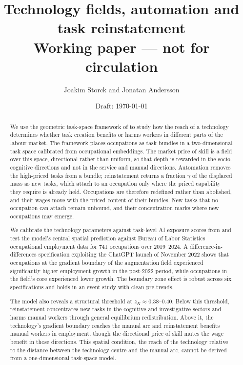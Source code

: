 \documentclass[12pt, a4paper]{article}
\title{Technology fields, automation and task reinstatement\\
\large Working paper --- not for circulation}
\author{Joakim Storck and Jonatan Andersson}
\date{Draft: \today}
\begin{document}
\maketitle

\begin{abstract}
\noindent
We use the geometric task-space framework of \textcite{storck2026geometry}
to study how the reach of a technology determines whether task creation
benefits or harms workers in different parts of the labour market.
The framework places occupations as task bundles in a two-dimensional
task space calibrated from occupational embeddings. The market price of
skill is a field over this space, directional rather than uniform, so
that depth is rewarded in the socio-cognitive directions and not in the
service and manual directions. Automation removes the high-priced tasks
from a bundle; reinstatement returns a fraction $\gamma$ of the displaced
mass as new tasks, which attach to an occupation only where the priced
capability they require is already held. Occupations are therefore
redefined rather than abolished, and their wages move with the priced
content of their bundles. New tasks that no occupation can attach remain
unbound, and their concentration marks where new occupations may emerge.

We calibrate the technology parameters against task-level AI exposure
scores from \textcite{gmyrek2025} and test the model's central spatial
prediction against Bureau of Labor Statistics occupational employment
data for 741 occupations over 2019--2024. A difference-in-differences
specification exploiting the ChatGPT launch of November 2022 shows
that occupations at the gradient boundary of the augmentation field
experienced significantly higher employment growth in the post-2022
period, while occupations in the field's core experienced lower growth.
The boundary zone effect is robust across six specifications and holds
in an event study with clean pre-trends.

The model also reveals a structural threshold at $z_K \approx
0.38$--$0.40$. Below this threshold, reinstatement concentrates new
tasks in the cognitive and investigative sectors and harms manual
workers through general equilibrium redistribution. Above it, the
technology's gradient boundary reaches the manual arc and reinstatement
benefits manual workers in employment, though the directional price of
skill mutes the wage benefit in those directions. This spatial
condition, the reach of the technology relative to the distance between
the technology centre and the manual arc, cannot be derived from a
one-dimensional task-space model.
\end{abstract}
\end{document}
